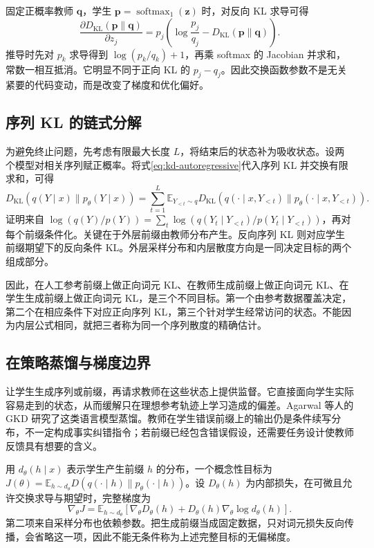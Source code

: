 \documentclass[UTF8,12pt,a4paper,fontset=fandol]{ctexart}
\begin{document}
固定正概率教师 $\mathbf q$，学生 $\mathbf p=\operatorname{softmax}_1(\mathbf z)$ 时，对反向 KL 求导可得
\begin{equation}
 \frac{\partial D_{\mathrm{KL}}(\mathbf p\|\mathbf q)}{\partial z_j}
 =p_j\left(\log\frac{p_j}{q_j}
             -D_{\mathrm{KL}}(\mathbf p\|\mathbf q)\right).
 \label{eq:kd-reverse-gradient}
\end{equation}
推导时先对 $p_k$ 求导得到 $\log(p_k/q_k)+1$，再乘 softmax 的 Jacobian 并求和，常数一相互抵消。它明显不同于正向 KL 的 $p_j-q_j$。因此交换函数参数不是无关紧要的代码变动，而是改变了梯度和优化偏好。

\subsection{序列 KL 的链式分解}
为避免终止问题，先考虑有限最大长度 $L$，将结束后的状态补为吸收状态。设两个模型对相关序列赋正概率。将式\eqref{eq:kd-autoregressive}代入序列 KL 并交换有限求和，可得
\begin{equation}
 D_{\mathrm{KL}}(q(Y\mid x)\|p_\theta(Y\mid x))
 =\sum_{t=1}^L\mathbb E_{Y_{<t}\sim q}
 D_{\mathrm{KL}}\left(q(\cdot\mid x,Y_{<t})\|
 p_\theta(\cdot\mid x,Y_{<t})\right).
 \label{eq:kd-sequence-chain}
\end{equation}
证明来自 $\log(q(Y)/p(Y))=\sum_t\log(q(Y_t\mid Y_{<t})/p(Y_t\mid Y_{<t}))$，再对每个前缀条件化。关键在于外层前缀由教师分布产生。反向序列 KL 则对应学生前缀期望下的反向条件 KL。外层采样分布和内层散度方向是一同决定目标的两个组成部分。

因此，在人工参考前缀上做正向词元 KL、在教师生成前缀上做正向词元 KL、在学生生成前缀上做正向词元 KL，是三个不同目标。第一个由参考数据覆盖决定，第二个在相应条件下对应正向序列 KL，第三个针对学生经常访问的状态。不能因为内层公式相同，就把三者称为同一个序列散度的精确估计。

\subsection{在策略蒸馏与梯度边界}
让学生生成序列或前缀，再请求教师在这些状态上提供监督。它直接面向学生实际容易走到的状态，从而缓解只在理想参考轨迹上学习造成的偏差。Agarwal 等人的 GKD 研究了这类语言模型蒸馏\cite{agarwal2024}。教师在学生错误前缀上的输出仍是条件续写分布，不一定构成事实纠错指令；若前缀已经包含错误假设，还需要任务设计使教师反馈具有想要的含义。

用 $d_\theta(h\mid x)$ 表示学生产生前缀 $h$ 的分布，一个概念性目标为 $J(\theta)=\mathbb E_{h\sim d_\theta}D(q(\cdot\mid h)\|p_\theta(\cdot\mid h))$。设 $D_\theta(h)$ 为内部损失，在可微且允许交换求导与期望时，完整梯度为
\begin{equation}
 \nabla_\theta J
 =\mathbb E_{h\sim d_\theta}\left[
 \nabla_\theta D_\theta(h)
 +D_\theta(h)\nabla_\theta\log d_\theta(h)\right].
 \label{eq:kd-onpolicy-gradient}
\end{equation}
第二项来自采样分布也依赖参数。把生成前缀当成固定数据，只对词元损失反向传播，会省略这一项，因此不能无条件称为上述完整目标的无偏梯度。
\end{document}
